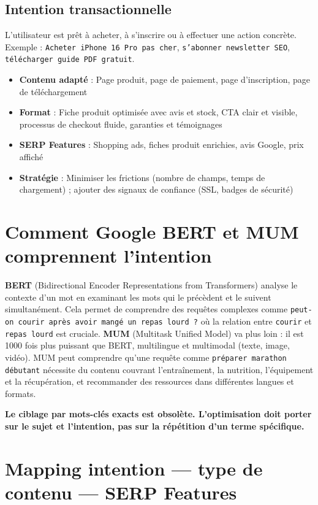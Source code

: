 \documentclass[12pt,a4paper,twoside]{report}
\newcommand{\keyword}[1]{\textbf{\textcolor{googleblue}{#1}}}
\newcommand{\important}[1]{\textbf{\textcolor{googlered}{#1}}}
\begin{document}
\subsection{Intention transactionnelle}
L'utilisateur est prêt à acheter, à s'inscrire ou à effectuer une action concrète. Exemple : \texttt{Acheter iPhone 16 Pro pas cher}, \texttt{s'abonner newsletter SEO}, \texttt{télécharger guide PDF gratuit}.

\begin{itemize}
    \item \textbf{Contenu adapté} : Page produit, page de paiement, page d'inscription, page de téléchargement
    \item \textbf{Format} : Fiche produit optimisée avec avis et stock, CTA clair et visible, processus de checkout fluide, garanties et témoignages
    \item \textbf{SERP Features} : Shopping ads, fiches produit enrichies, avis Google, prix affiché
    \item \textbf{Stratégie} : Minimiser les frictions (nombre de champs, temps de chargement) ; ajouter des signaux de confiance (SSL, badges de sécurité)
\end{itemize}

\section{Comment Google BERT et MUM comprennent l'intention}

\keyword{BERT} (Bidirectional Encoder Representations from Transformers) analyse le contexte d'un mot en examinant les mots qui le précèdent et le suivent simultanément. Cela permet de comprendre des requêtes complexes comme \texttt{peut-on courir après avoir mangé un repas lourd ?} où la relation entre \texttt{courir} et \texttt{repas lourd} est cruciale. \keyword{MUM} (Multitask Unified Model) va plus loin : il est 1000 fois plus puissant que BERT, multilingue et multimodal (texte, image, vidéo). MUM peut comprendre qu'une requête comme \texttt{préparer marathon débutant} nécessite du contenu couvrant l'entraînement, la nutrition, l'équipement et la récupération, et recommander des ressources dans différentes langues et formats.

\important{Le ciblage par mots-clés exacts est obsolète. L'optimisation doit porter sur le sujet et l'intention, pas sur la répétition d'un terme spécifique.}

\section{Mapping intention --- type de contenu --- SERP Features}
\end{document}
